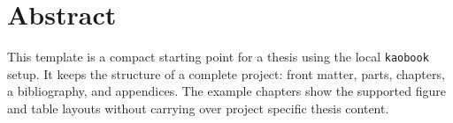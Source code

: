 
\chapter*{Abstract}

This template is a compact starting point for a thesis using the local
\texttt{kaobook} setup. It keeps the structure of a complete project: front
matter, parts, chapters, a bibliography, and appendices. The example chapters
show the supported figure and table layouts without carrying over project
specific thesis content.
